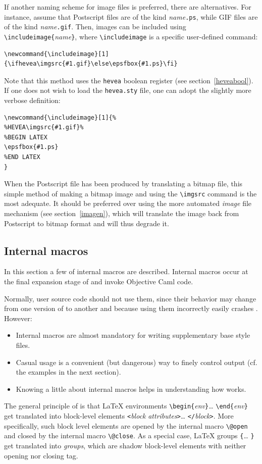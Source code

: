 If another naming scheme for image files is preferred, there are
alternatives.
For instance, assume that Postscript files are of the kind
\textit{name}\texttt{.ps}, while GIF files are of the kind
\textit{name}\texttt{.gif}.
Then, images can be included using
\verb+\includeimage{+\textit{name}\verb+}+, where
\verb+\includeimage+ is a specific user-defined command:
\begin{verbatim}
\newcommand{\includeimage}[1]{\ifhevea\imgsrc{#1.gif}\else\epsfbox{#1.ps}\fi}
\end{verbatim}
Note that this method uses the \texttt{hevea} boolean register (see
section~\ref{heveabool}).
If one does not wish to load the \texttt{hevea.sty} file,
one can adopt the slightly more verbose definition:
\begin{verbatim}
\newcommand{\includeimage}[1]{%
%HEVEA\imgsrc{#1.gif}%
%BEGIN LATEX
\epsfbox{#1.ps}
%END LATEX
}
\end{verbatim}
When the Postscript file has been produced by
translating a bitmap file, this simple method of making a bitmap image and
using the \verb+\imgsrc+ command 
is the most adequate.
It should be preferred over using the more automated \textit{image} file
mechanism (see section~\ref{imagen}),
which will translate the image back from
Postscript to bitmap format and will thus degrade it.




\subsection{Internal \label{internal}macros}
In this section a few of \hevea{} internal macros are
described.
Internal macros occur at the final expansion stage of \hevea{} and
invoke Objective Caml code.

Normally, user source code should not use them, since
their behavior may change from one version of \hevea{} to another and
because using them incorrectly easily
crashes \hevea.
However:
\begin{itemize}
\item Internal macros
are almost mandatory for writing supplementary base style files.
\item Casual usage is a convenient (but dangerous) way to finely control
output (cf. the examples in the next section).
\item Knowing a little about internal macros helps in understanding how
\hevea{} works.
\end{itemize}


The general principle of \hevea{} is that \LaTeX{} environments
\verb+\begin{+\textit{env}\verb+}+\ldots{}
\verb+\end{+\textit{env}\verb+}+ get
translated into \html{} block-level elements \verb+<+\textit{block}
\textit{attributes}\verb+>+\ldots{} \verb+</+\textit{block}\verb+>+.
More specifically, such block level elements are opened by the
internal macro \verb+\@open+ and closed by the internal macro
\verb+\@close+.
As a special case, \LaTeX{} groups \verb+{+\ldots{} \verb+}+
get translated into \html{} \emph{groups}, which are shadow block-level
elements with neither opening nor closing tag.

